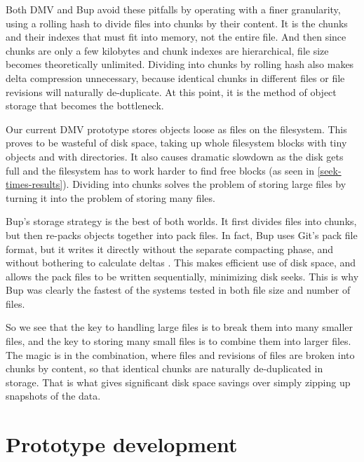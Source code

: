Both DMV and Bup avoid these pitfalls by operating with a finer granularity,
using a rolling hash to divide files into chunks by their content. It is the
chunks and their indexes that must fit into memory, not the entire file. And
then since chunks are only a few kilobytes and chunk indexes are hierarchical,
file size becomes theoretically unlimited. Dividing into chunks by rolling hash
also makes delta compression unnecessary, because identical chunks in different
files or file revisions will naturally de-duplicate. At this point, it is the
method of object storage that becomes the bottleneck.

Our current DMV prototype stores objects loose as files on the filesystem. This
proves to be wasteful of disk space, taking up whole filesystem blocks with tiny
objects and with directories. It also causes dramatic slowdown as the disk gets
full and the filesystem has to work harder to find free blocks (as seen in
\autoref{seek-times-results}). Dividing into chunks solves the problem of
storing large files by turning it into the problem of storing many files.

Bup's storage strategy is the best of both worlds. It first divides files into
chunks, but then re-packs objects together into pack files. In fact, Bup uses
Git's pack file format\footnotemark, but it writes it directly without the
separate compacting phase, and without bothering to calculate deltas
\cite{bup_design}. This makes efficient use of disk space, and allows the pack
files to be written sequentially, minimizing disk seeks. This is why Bup was
clearly the fastest of the systems tested in both file size and number of files.


So we see that the key to handling large files is to break them into many
smaller files, and the key to storing many small files is to combine them into
larger files. The magic is in the combination, where files and revisions of
files are broken into chunks by content, so that identical chunks are naturally
de-duplicated in storage. That is what gives significant disk space savings over
simply zipping up snapshots of the data.

%



\section{Prototype development}

